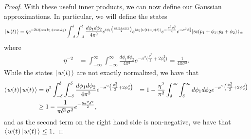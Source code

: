 \documentclass[../thesis-main/thesis-main]{subfiles}
\begin{document}
\begin{proof}
With these useful inner products, we can now define our Gaussian approximations.  In particular, we will define the states
\begin{align}
  |\mspace{2mu} w(t) \mspace{2mu} \rangle &= \eta e^{ - 2 i t (\cos k_1 + \cos k_2)} \int_{-\delta}^\delta \int_{-\delta}^\delta \frac{d\phi_1 d\phi_2}{4\pi^2} e^{i \phi_1 \big(\frac{\mu(t) + \nu(t)}{2}\big)} e^{i  \phi_2 (\nu(t) - \mu(t))} e^{ -\frac{ \sigma^2 \phi_1^2}{4}} e^{ -\sigma^2 \phi_2^2} |\mspace{2mu} \text{sc}(p_1 + \phi_1; p_2 + \phi_2) \mspace{2mu} \rangle_{\pm}
\end{align} 
where
\begin{align}
  \eta^{-2} &= \int_{-\infty}^\infty \int_{-\infty}^\infty \frac{d\phi_1 d\phi_2}{4\pi^2} e^{ -\sigma^2 \big(\frac{\phi_1^2}{2} + 2 \phi_2^2 \big)} = \frac{1}{4\pi\sigma^2}.
\end{align}
While the states $|\mspace{2mu} w(t) \mspace{2mu} \rangle$ are not exactly normalized, we have that
\begin{align}
   \langle\mspace{2mu} w(t) \mspace{2mu} | \mspace{2mu} w(t)\mspace{2mu} \rangle &= \eta^2 \int_{-\delta}^\delta \int_{-\delta}^\delta \frac{d\phi_1d\phi_2}{4\pi^2}  e^{ -\sigma^2 \big(\frac{\phi_1^2}{2} + 2 \phi_2^2 \big)} &= 1  - \frac{\eta^2}{\pi^2} \int_\delta^{\infty} \int_{\delta}^\infty d\phi_1d\phi_2 e^{ - \sigma^2 \big(\frac{\phi_1^2}{2} + 2 \phi_2^2\big)}\\
   & \geq  1 - \frac{1}{\pi \delta^2 \sigma^2}e^{- \frac{5 \sigma^2 \delta^2}{2}},
\end{align}
and as the second term on the right hand side is non-negative, we have that $\langle\mspace{2mu} w(t) \mspace{2mu} | \mspace{2mu} w(t)\mspace{2mu} \rangle \leq 1$.


\end{proof}
\end{document}
